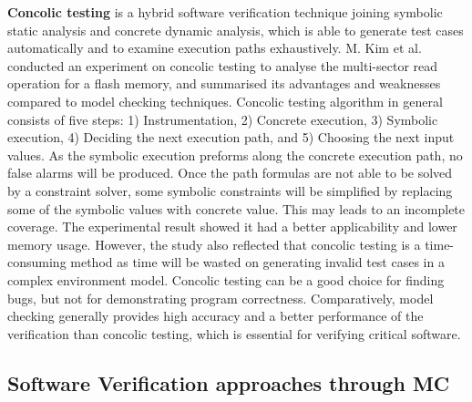 \textbf{Concolic testing} is a hybrid software verification technique joining symbolic static analysis and concrete dynamic analysis, which is able to generate test cases automatically and to examine execution paths exhaustively. M. Kim et al. \cite{Kim:2009:CTM:1693660.1693677} conducted an experiment on concolic testing to analyse the multi-sector read operation for a flash memory, and summarised its advantages and weaknesses compared to model checking techniques. Concolic testing algorithm in general consists of five steps: 1) Instrumentation, 2) Concrete execution, 3) Symbolic execution, 4) Deciding the next execution path, and 5) Choosing the next input values. As the symbolic execution preforms along the concrete execution path, no false alarms will be produced. Once the path formulas are not able to be solved by a constraint solver, some symbolic constraints will be simplified by replacing some of the symbolic values with concrete value. This may leads to an incomplete coverage. The experimental result showed it had a better applicability and lower memory usage. However, the study also reflected that concolic testing is a time-consuming method as time will be wasted on generating invalid test cases in a complex environment model. %
Concolic testing can be a good choice for finding bugs, but not for demonstrating program correctness. Comparatively, model checking generally provides high accuracy and a better performance of the verification than concolic testing, which is essential for verifying critical software.


\subsection{Software Verification approaches through MC}
